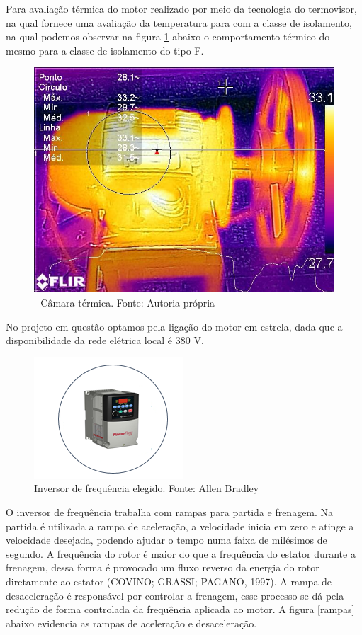 	Para avaliação térmica do motor realizado por meio da tecnologia do termovisor, na qual fornece uma avaliação da temperatura para com a classe de isolamento, na qual podemos observar na figura \ref{camera} abaixo o comportamento térmico do mesmo para a classe de isolamento do tipo F.
    \begin{figure}[h!]
	\centering
		\includegraphics[keepaspectratio=true,scale= 0.5]{figuras/camera.jpg}
	\caption{- Câmara térmica. Fonte: Autoria própria }
    \label{camera}
\end{figure}

No projeto em questão optamos pela ligação do motor em estrela, dada que a disponibilidade da rede elétrica local é 380 V.

\begin{figure}[!h]
	\centering
		\includegraphics[keepaspectratio=true,scale=1.0]{figuras/3.png}
	\caption{Inversor de frequência elegido. Fonte: Allen Bradley}
    \label{inversor}
\end{figure}


O inversor de frequência trabalha com rampas para partida e frenagem. Na partida é utilizada a rampa de aceleração, a velocidade inicia em zero e atinge a velocidade desejada, podendo ajudar o tempo numa faixa de milésimos de segundo. A frequência do rotor é maior do que a frequência do estator durante a frenagem, dessa forma é provocado um fluxo reverso da energia do rotor diretamente ao estator (COVINO; GRASSI; PAGANO, 1997). A rampa de desaceleração é responsável por controlar a frenagem, esse processo se dá pela redução de forma controlada da frequência aplicada ao motor. A figura \ref{rampas} abaixo evidencia as rampas de aceleração e desaceleração.

